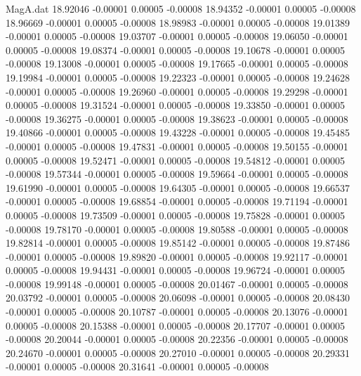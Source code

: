 \begin{filecontents}{MagA.dat}
  18.92046   -0.00001    0.00005   -0.00008
  18.94352   -0.00001    0.00005   -0.00008
  18.96669   -0.00001    0.00005   -0.00008
  18.98983   -0.00001    0.00005   -0.00008
  19.01389   -0.00001    0.00005   -0.00008
  19.03707   -0.00001    0.00005   -0.00008
  19.06050   -0.00001    0.00005   -0.00008
  19.08374   -0.00001    0.00005   -0.00008
  19.10678   -0.00001    0.00005   -0.00008
  19.13008   -0.00001    0.00005   -0.00008
  19.17665   -0.00001    0.00005   -0.00008
  19.19984   -0.00001    0.00005   -0.00008
  19.22323   -0.00001    0.00005   -0.00008
  19.24628   -0.00001    0.00005   -0.00008
  19.26960   -0.00001    0.00005   -0.00008
  19.29298   -0.00001    0.00005   -0.00008
  19.31524   -0.00001    0.00005   -0.00008
  19.33850   -0.00001    0.00005   -0.00008
  19.36275   -0.00001    0.00005   -0.00008
  19.38623   -0.00001    0.00005   -0.00008
  19.40866   -0.00001    0.00005   -0.00008
  19.43228   -0.00001    0.00005   -0.00008
  19.45485   -0.00001    0.00005   -0.00008
  19.47831   -0.00001    0.00005   -0.00008
  19.50155   -0.00001    0.00005   -0.00008
  19.52471   -0.00001    0.00005   -0.00008
  19.54812   -0.00001    0.00005   -0.00008
  19.57344   -0.00001    0.00005   -0.00008
  19.59664   -0.00001    0.00005   -0.00008
  19.61990   -0.00001    0.00005   -0.00008
  19.64305   -0.00001    0.00005   -0.00008
  19.66537   -0.00001    0.00005   -0.00008
  19.68854   -0.00001    0.00005   -0.00008
  19.71194   -0.00001    0.00005   -0.00008
  19.73509   -0.00001    0.00005   -0.00008
  19.75828   -0.00001    0.00005   -0.00008
  19.78170   -0.00001    0.00005   -0.00008
  19.80588   -0.00001    0.00005   -0.00008
  19.82814   -0.00001    0.00005   -0.00008
  19.85142   -0.00001    0.00005   -0.00008
  19.87486   -0.00001    0.00005   -0.00008
  19.89820   -0.00001    0.00005   -0.00008
  19.92117   -0.00001    0.00005   -0.00008
  19.94431   -0.00001    0.00005   -0.00008
  19.96724   -0.00001    0.00005   -0.00008
  19.99148   -0.00001    0.00005   -0.00008
  20.01467   -0.00001    0.00005   -0.00008
  20.03792   -0.00001    0.00005   -0.00008
  20.06098   -0.00001    0.00005   -0.00008
  20.08430   -0.00001    0.00005   -0.00008
  20.10787   -0.00001    0.00005   -0.00008
  20.13076   -0.00001    0.00005   -0.00008
  20.15388   -0.00001    0.00005   -0.00008
  20.17707   -0.00001    0.00005   -0.00008
  20.20044   -0.00001    0.00005   -0.00008
  20.22356   -0.00001    0.00005   -0.00008
  20.24670   -0.00001    0.00005   -0.00008
  20.27010   -0.00001    0.00005   -0.00008
  20.29331   -0.00001    0.00005   -0.00008
  20.31641   -0.00001    0.00005   -0.00008

\end{filecontents}
